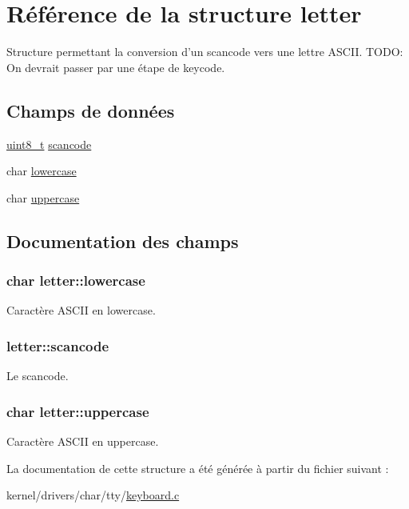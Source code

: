 \hypertarget{structletter}{\section{Référence de la structure letter}
\label{structletter}
}


Structure permettant la conversion d'un scancode vers une lettre A\-S\-C\-I\-I. T\-O\-D\-O\-: On devrait passer par une étape de keycode.  


\subsection*{Champs de données}
\begin{DoxyCompactItemize}
\item 
\hyperlink{types_8h_aba7bc1797add20fe3efdf37ced1182c5}{uint8\-\_\-t} \hyperlink{structletter_a81ce8d7b41dfa934b919f660bea2b52b}{scancode}
\item 
char \hyperlink{structletter_af4289f944a89553b8145286331ca3bdd}{lowercase}
\item 
char \hyperlink{structletter_abcf4b11624e2497e2d5798a805002268}{uppercase}
\end{DoxyCompactItemize}


\subsection{Documentation des champs}
\hypertarget{structletter_af4289f944a89553b8145286331ca3bdd}{
\subsubsection[{lowercase}]{\setlength{\rightskip}{0pt plus 5cm}char letter\-::lowercase}}\label{structletter_af4289f944a89553b8145286331ca3bdd}
Caractère A\-S\-C\-I\-I en lowercase. \hypertarget{structletter_a81ce8d7b41dfa934b919f660bea2b52b}{
\subsubsection[{scancode}]{ letter\-::scancode}}\label{structletter_a81ce8d7b41dfa934b919f660bea2b52b}
Le scancode. \hypertarget{structletter_abcf4b11624e2497e2d5798a805002268}{
\subsubsection[{uppercase}]{\setlength{\rightskip}{0pt plus 5cm}char letter\-::uppercase}}\label{structletter_abcf4b11624e2497e2d5798a805002268}
Caractère A\-S\-C\-I\-I en uppercase. 

La documentation de cette structure a été générée à partir du fichier suivant \-:\begin{DoxyCompactItemize}
\item 
kernel/drivers/char/tty/\hyperlink{keyboard_8c}{keyboard.\-c}\end{DoxyCompactItemize}
